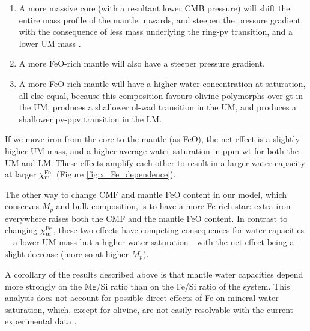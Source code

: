 \documentclass[fleqn,usenatbib]{mnras}
\newcommand{\todo}[1]{\textit{\textcolor{violet}{{#1}}}}
\newcommand{\coreeff}{$\chi^{\rm Fe}_{\rm m}$}
\begin{document}
\begin{enumerate}
    \item A more massive core (with a resultant lower CMB pressure) will shift the entire mass profile of the mantle upwards, and steepen the pressure gradient, with the consequence of less mass underlying the ring-pv transition, and a lower UM mass \citep{unterborn_scaling_2016, unterborn_pressure_2019}.
    \item A more FeO-rich mantle will also have a steeper pressure gradient.
    \item A more FeO-rich mantle will have a higher water concentration at saturation, all else equal, because this composition favours olivine polymorphs over gt in the UM, produces a shallower ol-wad transition in the UM, and produces a shallower pv-ppv transition in the LM.
\end{enumerate}

If we move iron from the core to the mantle (as FeO), the net effect is a slightly higher UM mass, and a higher average water saturation in ppm wt for both the UM and LM. These effects amplify each other to result in a larger water capacity at larger \coreeff~(Figure \ref{fig:x_Fe_dependence}).

The other way to change CMF and mantle FeO content in our model, which conserves $M_p$ and bulk composition, is to have a more Fe-rich star: extra iron everywhere raises both the CMF and the mantle FeO content. In contrast to changing \coreeff, these two effects have competing consequences for water capacities---a lower UM mass but a higher water saturation---with the net effect being a slight decrease (more so at higher $M_p$). 

A corollary of the results described above is that mantle water capacities depend more strongly on the Mg/Si ratio than on the Fe/Si ratio of the system. This analysis does not account for possible direct effects of Fe on mineral water saturation, which, except for olivine, are not easily resolvable with the current experimental data \citep{dong_water_2022}.



\end{document}
